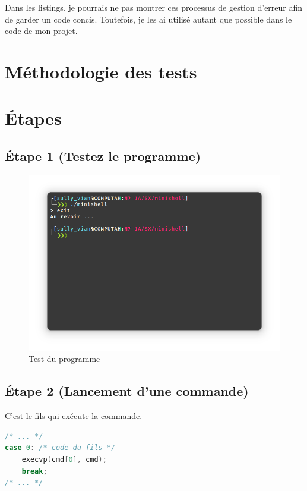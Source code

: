 \documentclass{article}
\begin{document}
Dans les listings, je pourrais ne pas montrer ces processus de gestion d'erreur afin de garder un code concis. Toutefois, je les ai utilisé autant que possible dans le code de mon projet.

\section{Méthodologie des tests}


\section{Étapes}

\subsection*{Étape 1 (Testez le programme)}

\begin{figure}[H]
    \centering
    \includegraphics[width=1\textwidth]{./resources/E1.png}
    \caption{Test du programme}
    \label{fig:E1}
\end{figure}

\subsection*{Étape 2 (Lancement d'une commande)}

C'est le fils qui exécute la commande.

\begin{lstlisting}[language=C, caption=Code de la question 2]
/* ... */
case 0: /* code du fils */
    execvp(cmd[0], cmd);
    break;
/* ... */
\end{lstlisting}
\end{document}
